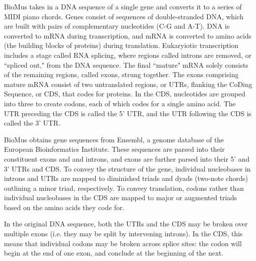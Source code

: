 \documentclass[letterpaper]{article}
\begin{document}
BioMus takes in a DNA sequence of a single gene and converts it to a series of MIDI piano chords. Genes consist of sequences of double-stranded DNA, 
which are built with pairs of complementary nucleotides (C-G and A-T). 
DNA is converted to mRNA during transcription, and mRNA is converted to amino acids (the building blocks of proteins) during translation. Eukaryiotic transcription includes a stage called RNA splicing, where regions called introns are removed, or ``spliced out," from the DNA sequence. The final ``mature" mRNA solely consists of the remaining regions, called exons, strung together. The exons comprising mature mRNA consist of two untranslated regions, or UTRs, flanking the CoDing Sequence, or CDS, that codes for proteins. 
In the CDS, nucleotides are grouped into three to create codons, each of which codes for a single amino acid. The UTR preceding the CDS is called the 5' UTR, and the UTR following the CDS is called the 3' UTR.

BioMus obtains gene sequences from Ensembl, a genome database of the European Bioinformatics Institute. These sequences are parsed into their constituent exons and and introns, and exons are further parsed into their 5' and 3' UTRs and CDS. To convey the structure of the gene, individual nucleobases in introns and UTRs are mapped to diminished triads and dyads (two-note chords) outlining a minor triad, respectively. To convey translation, codons rather than individual nucleobases in the CDS are mapped to major or augmented triads based on the amino acids they code for. 

In the original DNA sequence, both the UTRs and the CDS may be broken over multiple exons (i.e. they may be split by intervening introns). In the CDS, this means that individual codons may be broken across splice sites: the codon will begin at the end of one exon, and conclude at the beginning of the next. 
\end{document}
